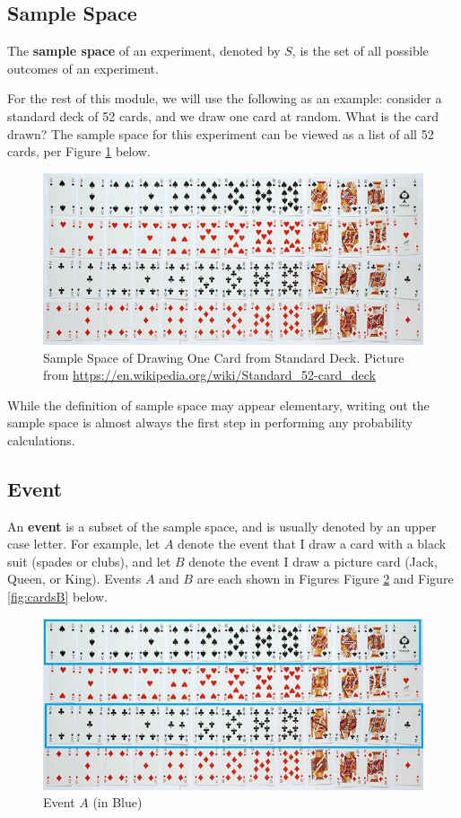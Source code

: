 \documentclass[
]{book}
\begin{document}
\subsection{Sample Space}\label{sample-space}

The \textbf{sample space} of an experiment, denoted by \(S\), is the set of all possible outcomes of an experiment.

For the rest of this module, we will use the following as an example: consider a standard deck of 52 cards, and we draw one card at random. What is the card drawn? The sample space for this experiment can be viewed as a list of all 52 cards, per Figure \ref{fig:cards} below.

\begin{figure}
\centering
\includegraphics{images/02-cards.jpg}
\caption{\label{fig:cards}Sample Space of Drawing One Card from Standard Deck. Picture from \url{https://en.wikipedia.org/wiki/Standard_52-card_deck}}
\end{figure}

While the definition of sample space may appear elementary, writing out the sample space is almost always the first step in performing any probability calculations.

\subsection{Event}\label{event}

An \textbf{event} is a subset of the sample space, and is usually denoted by an upper case letter. For example, let \(A\) denote the event that I draw a card with a black suit (spades or clubs), and let \(B\) denote the event I draw a picture card (Jack, Queen, or King). Events \(A\) and \(B\) are each shown in Figures Figure \ref{fig:cardsA} and Figure \ref{fig:cardsB} below.

\begin{figure}
\centering
\includegraphics{images/02-cardsA.jpg}
\caption{\label{fig:cardsA}Event \(A\) (in Blue)}
\end{figure}
\end{document}
